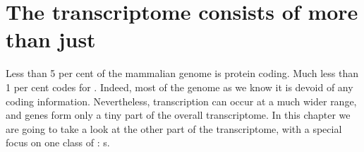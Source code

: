 \chapter{The  transcriptome consists of more than just }

Less than \num{5} per cent of the mammalian genome is protein coding. Much less
than \num{1} per cent codes for \trna[s]. Indeed, most of the genome as we know
it is devoid of any coding information\todo[ref]{}. Nevertheless,  transcription can
occur at a much wider range, and \trna genes form only a tiny part of the
overall  transcriptome. In this chapter we are going to take a look at the
other part of the  transcriptome, with a special focus on one class of
: s.



